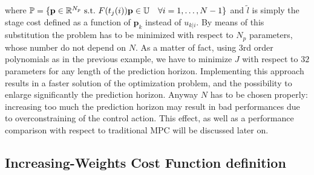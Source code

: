 where $\mathbb{P} = \lbrace \textbf{p}\in \mathbb{R}^{N_p}\ \textnormal{s.t.}\ F(t_j(i))\textbf{p} \in \mathbb{U}\quad \forall i = 1, \dots, N-1 \rbrace $ and $\tilde{l}$ is simply the stage cost defined as a function of $\textbf{p}_k$ instead of ${u}_{k|i}$. By means of this substitution the problem has to be minimized with respect to $N_p$ parameters, whose number do not depend on $N$. As a matter of fact, using 3rd order polynomials as in the previous example, we have to minimize $J$ with respect to $32$ parameters for any length of the prediction horizon. Implementing this approach results in a faster solution of the optimization problem, and the possibility to enlarge significantly the prediction horizon. Anyway $N$ has to be chosen properly: increasing too much the prediction horizon may result in bad performances due to overconstraining of the control action. This effect, as well as a performance comparison with respect to traditional MPC will be discussed later on.
\subsection{Increasing-Weights Cost Function definition}

